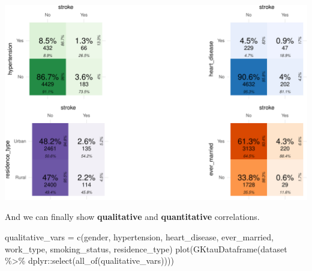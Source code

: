 \documentclass[
]{article}
\newenvironment{Shaded}{\begin{snugshade}}{\end{snugshade}}
\newcommand{\FunctionTok}[1]{\textcolor[rgb]{0.00,0.00,0.00}{#1}}
\newcommand{\NormalTok}[1]{#1}
\newcommand{\OtherTok}[1]{\textcolor[rgb]{0.56,0.35,0.01}{#1}}
\newcommand{\SpecialCharTok}[1]{\textcolor[rgb]{0.00,0.00,0.00}{#1}}
\newcommand{\StringTok}[1]{\textcolor[rgb]{0.31,0.60,0.02}{#1}}
\begin{document}
\begin{center}\includegraphics{report_files/figure-latex/unnamed-chunk-6-1} \end{center}

And we can finally show \textbf{qualitative} and \textbf{quantitative}
correlations.

\begin{Shaded}
\begin{Highlighting}[]
\NormalTok{qualitative\_vars }\OtherTok{=} \FunctionTok{c}\NormalTok{(}\StringTok{\textquotesingle{}gender\textquotesingle{}}\NormalTok{, }\StringTok{\textquotesingle{}hypertension\textquotesingle{}}\NormalTok{, }\StringTok{\textquotesingle{}heart\_disease\textquotesingle{}}\NormalTok{, }\StringTok{\textquotesingle{}ever\_married\textquotesingle{}}\NormalTok{,}
                      \StringTok{\textquotesingle{}work\_type\textquotesingle{}}\NormalTok{, }\StringTok{\textquotesingle{}smoking\_status\textquotesingle{}}\NormalTok{, }\StringTok{\textquotesingle{}residence\_type\textquotesingle{}}\NormalTok{)}
\FunctionTok{plot}\NormalTok{(}\FunctionTok{GKtauDataframe}\NormalTok{(dataset }\SpecialCharTok{\%\textgreater{}\%}\NormalTok{ dplyr}\SpecialCharTok{::}\FunctionTok{select}\NormalTok{(}\FunctionTok{all\_of}\NormalTok{(qualitative\_vars))))}
\end{Highlighting}
\end{Shaded}
\end{document}
